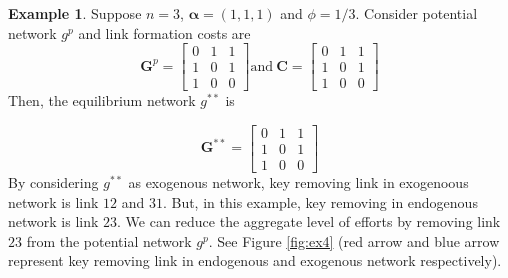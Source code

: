 \documentclass[12pt]{article}
\theoremstyle{definition}
\newtheorem{example}{Example}
\newcommand{\bm}[1]{\boldsymbol{#1}}
\begin{document}
\begin{example}
Suppose $n=3$, $\bm{\alpha} = (1,1,1)$ and $\phi = 1/3$.
Consider potential network $g^p$ and link formation costs are
\[
\bm{G}^p = \left[
            \begin{array}{ccc}
                0 & 1 & 1 \\
                1 & 0 & 1 \\
                1 & 0 & 0
            \end{array} \right]
\text{and} \ 
\bm{C} = \left[
            \begin{array}{ccc}
                0 & 1 & 1 \\
                1 & 0 & 1 \\
                1 & 0 & 0
            \end{array} \right]\]
Then, the equilibrium network $g^{**}$ is

\[ \bm{G}^{**} = \left[
    \begin{array}{ccc}
        0 & 1 & 1 \\
        1 & 0 & 1 \\
        1 & 0 & 0
    \end{array} \right] \]
By considering $g^{**}$ as exogenous network, key removing link in exogenoous network is link $12$ and $31$.
But, in this example, key removing in endogenous network is link $23$.
We can reduce the aggregate level of efforts by removing link $23$ from the potential network $g^p$.
See Figure \ref{fig:ex4} (red arrow and blue arrow represent key removing link in endogenous and exogenous network respectively).
\end{example}
\end{document}
